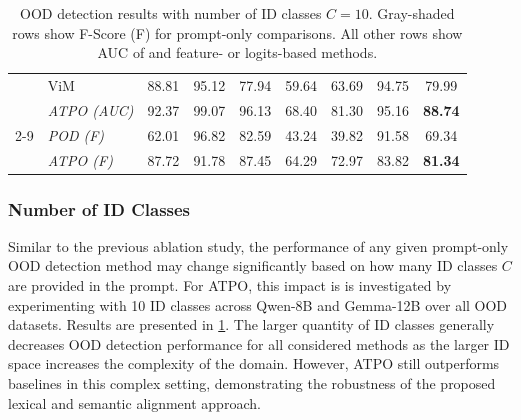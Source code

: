 \begin{table}[t!]
{\begin{tabular}{|l|l|ccccccc|}
                             &  ViM                    &   88.81 &   95.12  &   77.94  &   59.64  &   63.69  &   94.75  &   \multicolumn{1}{|c|}{79.99}  \\ %
                             &  \textit{ATPO (AUC)} &  92.37  &   99.07  &  96.13  &  68.40  &  81.30  &  95.16  &   \multicolumn{1}{|c|}{ \textbf{88.74}}  \\ \cline{2-9}
                             &  \cellcolor{rowGray} \textit{POD (F)}  &  \cellcolor{rowGray} 62.01  &  \cellcolor{rowGray} 96.82  & \cellcolor{rowGray} 82.59  & \cellcolor{rowGray} 43.24  &  \cellcolor{rowGray} 39.82  &  \cellcolor{rowGray} 91.58  &   \multicolumn{1}{|c|}{ \cellcolor{rowGray} 69.34}  \\
                             &  \cellcolor{rowGray} \textit{ATPO (F)} &  \cellcolor{rowGray} 87.72  &  \cellcolor{rowGray} 91.78  & \cellcolor{rowGray} 87.45  & \cellcolor{rowGray} 64.29  &  \cellcolor{rowGray} 72.97  &  \cellcolor{rowGray} 83.82  &   \multicolumn{1}{|c|}{ \cellcolor{rowGray} \textbf{81.34}}  \\ \hline
\end{tabular}
}
\caption{
OOD detection results with number of ID classes $C=10$. Gray-shaded rows show F-Score (F) for prompt-only comparisons. All other rows show AUC of \syst and feature- or logits-based methods.
}
\label{tab:atpo_results-icl10}
\end{table}

\subsubsection{Number of ID Classes}
Similar to the previous ablation study, the performance of any given prompt-only OOD detection method may change significantly based on how many ID classes $C$ are provided in the prompt. For ATPO, this impact is is investigated by experimenting with 10 ID classes across Qwen-8B and Gemma-12B over all OOD datasets. Results are presented in \ref{tab:atpo_results-icl10}. The larger quantity of ID classes generally decreases OOD detection performance for all considered methods as the larger ID space increases the complexity of the domain. However, ATPO still outperforms baselines in this complex setting, demonstrating the robustness of the proposed lexical and semantic alignment approach.

